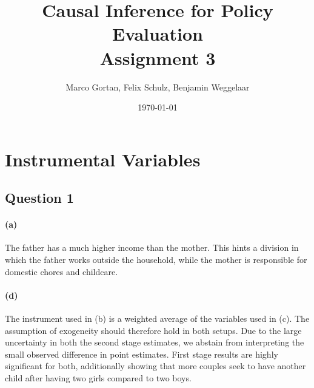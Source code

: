 \documentclass{scrartcl}
\title{Causal Inference for Policy Evaluation\\
\Large{Assignment 3}}
\author{Marco Gortan, Felix Schulz, Benjamin Weggelaar}
\date{\today}
\begin{document}
\maketitle

\section*{Instrumental Variables}

\subsection*{Question 1}

\paragraph*{(a)}

The father has a much higher income than the mother. This hints a division in which the father works outside the household, while the mother is responsible for domestic chores and childcare.



\paragraph*{(d)}


\begin{minipage}{1\textwidth}

\end{minipage}
% 



The instrument used in (b) is a weighted average of the variables used in (c). The assumption of exogeneity should therefore hold in both setups. Due to the large uncertainty in both the second stage estimates, we abstain from interpreting the small observed difference in point estimates. First stage results are highly significant for both, additionally showing that more couples seek to have another child after having two girls compared to two boys.
\end{document}
